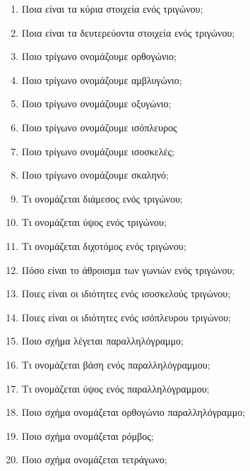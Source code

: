 \documentclass[a4paper,11pt]{report}
\begin{document}



\begin{enumerate}
\item Ποια είναι τα κύρια στοιχεία ενός τριγώνου;
\item Ποια είναι τα δευτερεύοντα στοιχεία ενός τριγώνου;
\item Ποιο τρίγωνο ονομάζουμε ορθογώνιο;
\item Ποιο τρίγωνο ονομάζουμε αμβλυγώνιο;
\item Ποιο τρίγωνο ονομάζουμε οξυγώνιο;
\item Ποιο τρίγωνο ονομάζουμε ισόπλευρος
\item Ποιο τρίγωνο ονομάζουμε ισοσκελές;
\item Ποιο τρίγωνο ονομάζουμε σκαληνό; 
\item Τι ονομάζεται διάμεσος ενός τριγώνου;
\item Τι ονομάζεται ύψος ενός τριγώνου;
\item Τι ονομάζεται διχοτόμος ενός τριγώνου;
\item Πόσο είναι το άθροισμα των γωνιών ενός τριγώνου;
\item Ποιες είναι οι ιδιότητες ενός ισοσκελούς τριγώνου;
\item Ποιες είναι οι ιδιότητες ενός ισόπλευρου τριγώνου;
\item Ποιο σχήμα λέγεται παραλληλόγραμμο;
\item Τι ονομάζεται βάση ενός παραλληλόγραμμου;
\item Τι ονομάζεται ύψος ενός παραλληλόγραμμου;
\item Ποιο σχήμα ονομάζεται ορθογώνιο παραλληλόγραμμο;
\item Ποιο σχήμα ονομάζεται ρόμβος;
\item Ποιο σχήμα ονομάζεται τετράγωνο;

\end{enumerate}
\end{document}
